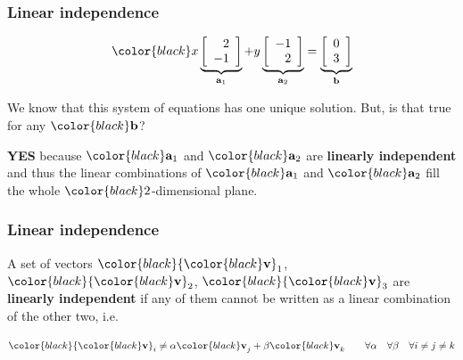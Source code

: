 \documentclass[compress]{beamer}
\newcommand{\black}[1]{{\color{black}#1}}
\renewcommand{\emph}[1]{\textbf{\black{#1}}}
\newcommand{\beq}[1]{\[\black{#1}\]}
\renewcommand{\v}{\black{\mathbf{v}}}
\begin{document}
\begin{frame}
\frametitle{Linear independence}

\beq{
x\underbrace{\left[
\begin{array}{r}
2\\
-1
\end{array}
\right]}_{\a_1}+y
\underbrace{\left[
\begin{array}{r}
-1\\
2
\end{array}
\right]}_{\a_2} = \underbrace{\left[
\begin{array}{c}
0\\ 
3
\end{array}
\right]}_{\b}
}

We know that this system of equations has one unique solution. But, is that true for any $\black{\b}$?

\vspace{1cm}
\emph{YES} because $\black{\a_1}$ and $\black{\a_2}$ are \emph{linearly independent} and thus the linear combinations of $\black{\a_1}$ and $\black{\a_2}$ fill the whole $\black{2}$-dimensional plane.

\end{frame}


\begin{frame}
\frametitle{Linear independence}

A set of vectors $\black{\v_1}$, $\black{\v_2}$, $\black{\v_3}$ are \emph{linearly independent} if any of them cannot be written as a linear combination of the other two, i.e.

\beq{
\v_i \neq \alpha\v_j + \beta\v_k \qquad  \forall \alpha \quad \forall \beta \quad \forall i\neq j \neq k
}



\end{frame}

\end{document}
